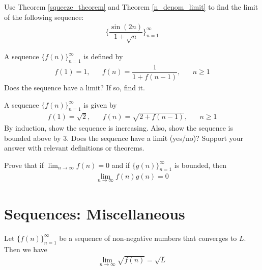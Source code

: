 \begin{exercise}
Use Theorem \ref{squeeze_theorem} and Theorem \ref{n_denom_limit} to find the limit of the following sequence:
\begin{align*}
    \Big\{\dfrac{\sin(2n)}{1+\sqrt{n}}\Big\}_{n=1}^{\infty}
\end{align*}
\end{exercise}

\begin{exercise}
A sequence $\{f(n)\}_{n=1}^{\infty}$ is defined by 
\begin{align*}
    f(1) = 1, \hspace{20pt} f(n) = \dfrac{1}{1+f(n-1)}, \hspace{20pt} n \geq 1
\end{align*}
Does the sequence have a limit? If so, find it.
\end{exercise}

\begin{exercise}
A sequence $\{f(n)\}_{n=1}^{\infty}$ is given by 
\begin{align*}
    f(1) = \sqrt{2}, \hspace{20pt} f(n) = \sqrt{2 + f(n-1)}, \hspace{20pt} n \geq 1
\end{align*}
By induction, show the sequence is increasing. Also, show the sequence is bounded above by $3$. Does the sequence have a limit (yes/no)? Support your answer with relevant definitions or theorems.
\end{exercise}

\begin{exercise}
Prove that if $\lim_{n \longrightarrow \infty} f(n) = 0$ and if $\{g(n)\}_{n=1}^{\infty}$ is bounded, then 
\begin{align*}
    \lim_{n \longrightarrow \infty} f(n)g(n) = 0
\end{align*}
\end{exercise}

\newpage
\section{Sequences: Miscellaneous} 

\begin{theorem}
Let $\{f(n)\}_{n=1}^{\infty}$ be a sequence of non-negative numbers that converges to $L$. Then we have 
\begin{align*}
    \lim_{n \longrightarrow \infty} \sqrt{f(n)} = \sqrt{L}
\end{align*}
\label{limit_passes_under_square_root}
\end{theorem}